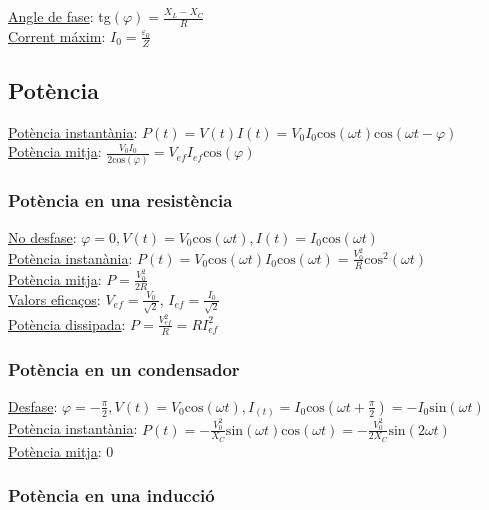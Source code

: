 \documentclass[12pt]{article}
\begin{document}
\begin{multicols}{2}
\underline{Angle de fase}: tg$(\varphi)=\frac{X_L-X_C}{R}$ \\
\underline{Corrent máxim}: $I_0 = \frac{\varepsilon_0}{Z}$

\subsection*{Potència}

\underline{Potència instantània}: $P(t) = V(t)I(t) = V_0I_0\text{cos}(\omega t)\text{cos}(\omega t - \varphi)$ \\
\underline{Potència mitja}: $\frac{V_0I_0}{2\text{cos}(\varphi)} = V_{ef}I_{ef}\text{cos}(\varphi)$

\subsubsection*{Potència en una resistència}

\underline{No desfase}: $\varphi = 0, V(t) = V_0\text{cos}(\omega t), I(t) = I_0\text{cos}(\omega t)$ \\
\underline{Potència instanània}: $P(t) = V_0\text{cos}(\omega t)I_0\text{cos}(\omega t) = \frac{V_0^2}{R}\text{cos}^2(\omega t)$ \\
\underline{Potència mitja}: $P = \frac{V_0^2}{2R}$ \\
\underline{Valors eficaços}: $V_{ef} = \frac{V_0}{\sqrt{2}}$, $I_{ef} = \frac{I_0}{\sqrt{2}}$ \\
\underline{Potència dissipada}: $P = \frac{V_{ef}^2}{R} = RI_{ef}^2$

\subsubsection*{Potència en un condensador}

\underline{Desfase}: $\varphi = -\frac{\pi}{2}, V(t) = V_0\text{cos}(\omega t), I_(t) = I_0\text{cos}(\omega t + \frac{\pi}{2}) = -I_0\text{sin}(\omega t)$ \\
\underline{Potència instantània}: $P(t) = -\frac{V_0^2}{X_C}\text{sin}(\omega t)\text{cos}(\omega t) = -\frac{V_0^2}{2X_C}\text{sin}(2\omega t)$ \\
\underline{Potència mitja}: 0 \\

\subsubsection*{Potència en una inducció}


\end{multicols}
\end{document}
